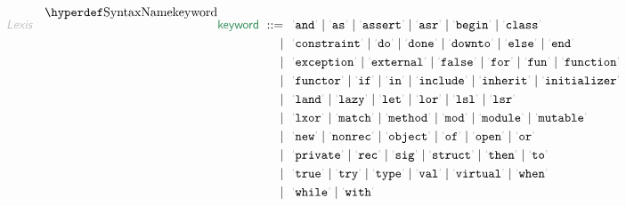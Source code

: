 \begin{align*}
  \KEY{Lexis} \quad
     \SYNDECL{keyword}
      \ ::= \ & \
      \LEX{and} \mid \LEX{as} \mid \LEX{assert} \mid \LEX{asr} \mid \LEX{begin} \mid \LEX{class} \\
      \ \mid \ & \ \LEX{constraint} \mid \LEX{do} \mid \LEX{done} \mid \LEX{downto} \mid \LEX{else} \mid \LEX{end} \\
      \ \mid \ & \ \LEX{exception} \mid \LEX{external} \mid \LEX{false} \mid \LEX{for} \mid \LEX{fun} \mid \LEX{function} \\
      \ \mid \ & \ \LEX{functor} \mid \LEX{if} \mid \LEX{in} \mid \LEX{include} \mid \LEX{inherit} \mid \LEX{initializer} \\
      \ \mid \ & \ \LEX{land} \mid \LEX{lazy} \mid \LEX{let} \mid \LEX{lor} \mid \LEX{lsl} \mid \LEX{lsr} \\
      \ \mid \ & \ \LEX{lxor} \mid \LEX{match} \mid \LEX{method} \mid \LEX{mod} \mid \LEX{module} \mid \LEX{mutable} \\
      \ \mid \ & \ \LEX{new} \mid \LEX{nonrec} \mid \LEX{object} \mid \LEX{of} \mid \LEX{open} \mid \LEX{or} \\
      \ \mid \ & \ \LEX{private} \mid \LEX{rec} \mid \LEX{sig} \mid \LEX{struct} \mid \LEX{then} \mid \LEX{to} \\
      \ \mid \ & \ \LEX{true} \mid \LEX{try} \mid \LEX{type} \mid \LEX{val} \mid \LEX{virtual} \mid \LEX{when} \\
      \ \mid \ & \ \LEX{while} \mid \LEX{with}
\end{align*}


